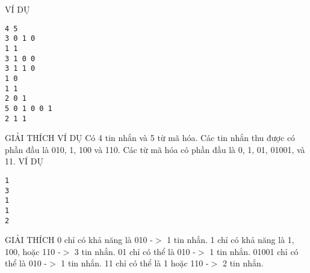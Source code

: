 VÍ DỤ  
\begin{verbatim}
4 5
3 0 1 0
1 1
3 1 0 0
3 1 1 0
1 0
1 1
2 0 1
5 0 1 0 0 1
2 1 1
\end{verbatim}
   GIẢI THÍCH VÍ DỤ  
Có 4 tin nhắn và 5 từ mã hóa. Các tin nhắn thu được có phần đầu là 010, 1, 100 và 110. Các từ mã hóa có phần đầu là 0, 1, 01, 01001, và 11.
   VÍ DỤ  
\begin{verbatim}
1
3
1
1
2
\end{verbatim}
   GIẢI THÍCH  
0 chỉ có khả năng là 010 -$>$ 1 tin nhắn. 1 chỉ có khả năng là 1, 100, hoặc 110 -$>$ 3 tin nhắn. 01 chỉ có thể là 010 -$>$ 1 tin nhắn. 01001 chỉ có thể là 010 -$>$ 1 tin nhắn. 11 chỉ có thể là 1 hoặc 110 -$>$ 2 tin nhắn.